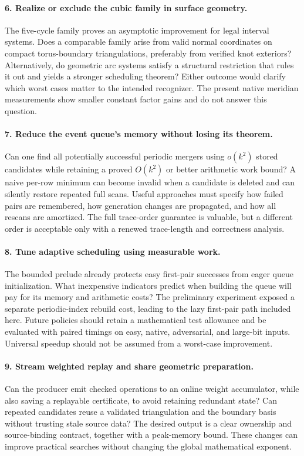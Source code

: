 \paragraph{6. Realize or exclude the cubic family in surface geometry.}
The five-cycle family proves an asymptotic improvement for legal interval
systems.  Does a comparable family arise from valid normal coordinates on
compact torus-boundary triangulations, preferably from verified knot
exteriors?  Alternatively, do geometric arc systems satisfy a structural
restriction that rules it out and yields a stronger scheduling theorem?
Either outcome would clarify which worst cases matter to the intended
recognizer.  The present native meridian measurements show smaller constant
factor gains and do not answer this question.

\paragraph{7. Reduce the event queue's memory without losing its theorem.}
Can one find all potentially successful periodic mergers using
$o(k^2)$ stored candidates while retaining a proved $O(k^2)$ or better
arithmetic work bound?  A naive per-row minimum can become invalid when a
candidate is deleted and can silently restore repeated full scans.  Useful
approaches must specify how failed pairs are remembered, how generation
changes are propagated, and how all rescans are amortized.  The full
trace-order guarantee is valuable, but a different order is acceptable only
with a renewed trace-length and correctness analysis.

\paragraph{8. Tune adaptive scheduling using measurable work.}
The bounded prelude already protects easy first-pair successes from eager
queue initialization.  What inexpensive indicators predict when building
the queue will pay for its memory and arithmetic costs?  The preliminary
experiment exposed a separate periodic-index rebuild cost, leading to the
lazy first-pair path included here.  Future policies should retain a
mathematical test allowance and be evaluated with paired timings on easy,
native, adversarial, and large-bit inputs.  Universal speedup should not be
assumed from a worst-case improvement.

\paragraph{9. Stream weighted replay and share geometric preparation.}
Can the producer emit checked operations to an online weight accumulator,
while also saving a replayable certificate, to avoid retaining redundant
state?  Can repeated candidates reuse a validated triangulation and the
boundary basis without trusting stale source data?  The desired output is a
clear ownership and source-binding contract, together with a peak-memory
bound.  These changes can improve practical searches without changing the
global mathematical exponent.

